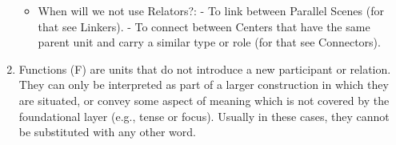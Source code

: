 \documentclass[11pt]{article}
\newcommand{\orig}[1]{{\color{red} {#1}}}
\newcommand{\dcom}[1]{\textit{\color{blue}{#1}}}
\begin{document}
\begin{enumerate}
\begin{itemize}
    \item
	When will we not use Relators?: 
  - To link between Parallel Scenes (for that see Linkers). 
  - To connect between Centers that have the same parent unit and carry a similar type or role (for that see Connectors). 

\end{itemize}






    
    



\item
  Functions (F) are units that do not introduce a new participant or relation.
  They can only be interpreted as part of a larger construction in which they are situated,
  or convey some aspect of meaning which is not covered by the foundational layer (e.g., tense or focus).
  Usually in these cases, they cannot be substituted with any other word.


\end{enumerate}
\end{document}
